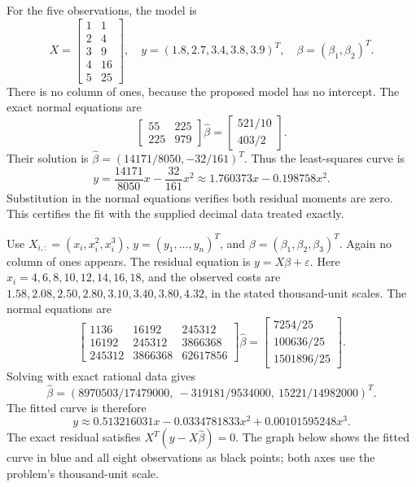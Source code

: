 For the five observations, the model is
\[
 X=\begin{bmatrix}1&1\\2&4\\3&9\\4&16\\5&25\end{bmatrix},\quad
 y=(1.8,2.7,3.4,3.8,3.9)^T,\quad\beta=(\beta_1,\beta_2)^T.
\]
There is no column of ones, because the proposed model has no intercept.
The exact normal equations are
\[
 \begin{bmatrix}55&225\\225&979\end{bmatrix}\widehat\beta
 =\begin{bmatrix}521/10\\403/2\end{bmatrix}.
\]
Their solution is $\widehat\beta=(14171/8050,-32/161)^T$.
Thus the least-squares curve is
\[
 y=\frac{14171}{8050}x-\frac{32}{161}x^2
 \approx1.760373x-0.198758x^2.
\]
Substitution in the normal equations verifies both residual moments
are zero. This certifies the fit with the supplied decimal data treated exactly.

Use $X_{i,:}=(x_i,x_i^2,x_i^3)$, $y=(y_1,\ldots,y_n)^T$,
and $\beta=(\beta_1,\beta_2,\beta_3)^T$. Again no column of
ones appears. The residual equation is $y=X\beta+\varepsilon$.
Here $x_i=4,6,8,10,12,14,16,18$, and the observed costs are
$1.58,2.08,2.50,2.80,3.10,3.40,3.80,4.32$, in the stated
thousand-unit scales. The normal equations are
\[
 \begin{bmatrix}1136&16192&245312\\16192&245312&3866368\\245312&3866368&62617856\end{bmatrix}
 \widehat\beta
 =\begin{bmatrix}7254/25\\100636/25\\1501896/25\end{bmatrix}.
\]
Solving with exact rational data gives
\[
 \widehat\beta=
 (8970503/17479000,\ -319181/9534000,\ 15221/14982000)^T.
\]
The fitted curve is therefore
\[
 y\approx0.513216031x-0.0334781833x^2+0.00101595248x^3.
\]
The exact residual satisfies $X^T(y-X\widehat\beta)=0$.
The graph below shows the fitted curve in blue and all eight observations
as black points; both axes use the problem's thousand-unit scale.

